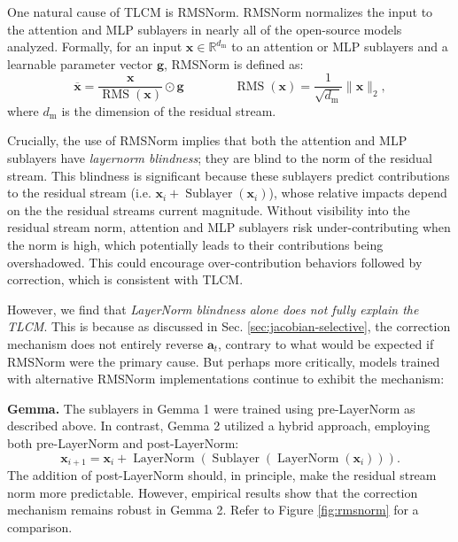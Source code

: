 One natural cause of TLCM is RMSNorm. RMSNorm normalizes the input to the attention and MLP sublayers in nearly all of the open-source models analyzed.  
Formally, for an input $\mathbf{x} \in \mathbb{R}^{d_\text{m}}$ to an attention or MLP sublayers and a learnable parameter vector $\mathbf{g}$, RMSNorm is defined as:
$$\overline{\mathbf{x}} = \frac{\mathbf{x}}{\operatorname{RMS}(\mathbf{x})} \odot \mathbf{g} \qquad \qquad \operatorname{RMS}(\mathbf{x}) = \frac{1}{\sqrt{d_\text{m}}} \|\mathbf{x}\|_2,$$
where $d_\text{m}$ is the dimension of the residual stream. 

Crucially, the use of RMSNorm implies that both the attention and MLP sublayers have \emph{layernorm blindness}; they are blind to the norm of the residual stream. This blindness is significant because these sublayers predict contributions to the residual stream (i.e. $\mathbf{x}_i + \operatorname{Sublayer}(\mathbf{x}_i)$), whose relative impacts depend on the the residual streams current magnitude. 
Without visibility into the residual stream norm, attention and MLP sublayers risk under-contributing when the norm is high, which potentially leads to their contributions being overshadowed. This could encourage over-contribution behaviors followed by correction, which is consistent with TLCM. 


However, we find that \emph{LayerNorm blindness alone does not fully explain the  TLCM}. This is because as discussed in Sec. \ref{sec:jacobian-selective}, the correction mechanism does not entirely reverse $\mathbf{a}_t$, contrary to what would be expected if RMSNorm were the primary cause. But perhaps more critically, models trained with alternative RMSNorm implementations continue to exhibit the mechanism:

\textbf{Gemma.} The sublayers in Gemma 1 were trained using pre-LayerNorm as described above. In contrast, Gemma 2 utilized a hybrid approach, employing both pre-LayerNorm and post-LayerNorm:
$$\mathbf{x}_{i+1} = \mathbf{x}_i + \operatorname{LayerNorm}(\operatorname{Sublayer}(\operatorname{LayerNorm}(\mathbf{x}_i))).$$
The addition of post-LayerNorm should, in principle, make the residual stream norm more predictable. However, empirical results show that the correction mechanism remains robust in Gemma 2. Refer to Figure \ref{fig:rmsnorm} for a comparison.

